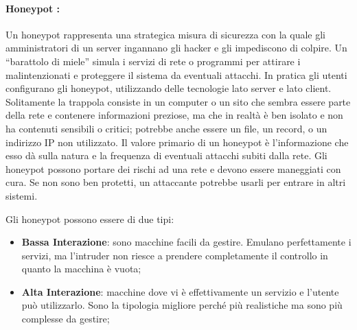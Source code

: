 \paragraph{Honeypot {\normalfont {}}:}
Un honeypot rappresenta una strategica misura di sicurezza con la quale gli
amministratori
di un server ingannano gli hacker e gli impediscono di colpire.
Un ``barattolo di miele'' simula i
servizi di rete o programmi per attirare i malintenzionati e proteggere il
sistema da eventuali
attacchi. In pratica gli utenti configurano gli honeypot, utilizzando delle
tecnologie lato server e lato
client. Solitamente la trappola consiste in un computer o un sito che sembra
essere parte della rete
e contenere informazioni preziose, ma che in realtà è ben isolato e non ha
contenuti sensibili o
critici; potrebbe anche essere un file, un record, o un indirizzo IP non utilizzato.
Il valore primario di un honeypot è l'informazione che esso dà sulla natura e la
frequenza di
eventuali attacchi subiti dalla rete.
Gli honeypot possono portare dei rischi ad una rete e devono essere maneggiati
con cura. Se non
sono ben protetti, un attaccante potrebbe usarli per entrare in altri sistemi.

Gli honeypot possono essere di due tipi:
\begin{itemize}
      \item \textbf{Bassa Interazione}: sono macchine facili da gestire. Emulano perfettamente
            i servizi, ma l'intruder non riesce a prendere completamente il controllo in
            quanto la macchina è vuota;
      \item \textbf{Alta Interazione}: macchine dove vi è effettivamente un servizio e
            l'utente può utilizzarlo.
            Sono la tipologia migliore perché più realistiche ma sono più complesse
            da gestire;
\end{itemize}